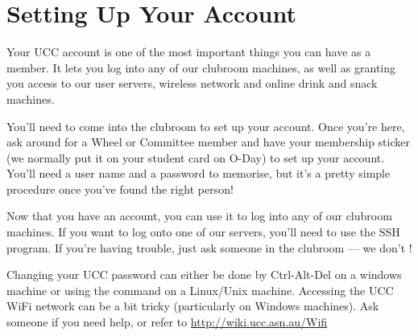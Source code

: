 \chapter{Setting Up Your Account}


Your UCC account is one of the most important things you can have as a member. It lets you log into any of our clubroom machines, as well as granting you access to our user servers, wireless network and online drink and snack machines.


You'll need to come into the clubroom to set up your account. Once you're here, ask around for a Wheel or Committee member and have your membership sticker (we normally put it on your student card on O-Day) to set up your account. You'll need a user name and a password to memorise, but it's a pretty simple procedure once you've found the right person!


Now that you have an account, you can use it to log into any of our clubroom machines. If you want to log onto one of our servers, you'll need to use the SSH program. If you're having trouble, just ask someone in the clubroom --- we don't !


Changing your UCC password can either be done by Ctrl-Alt-Del on a windows machine or using the command  on a Linux/Unix machine.
Accessing the UCC WiFi network can be a bit tricky (particularly on Windows machines). Ask someone if you need help, or refer to \url{http://wiki.ucc.asn.au/Wifi}

